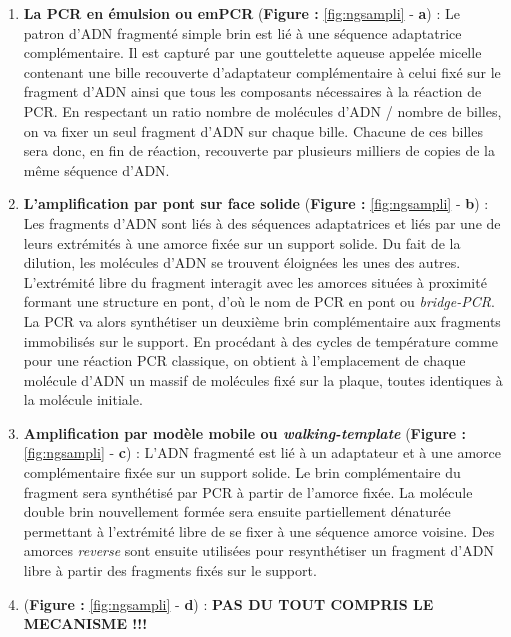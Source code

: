 \documentclass[12pt,twoside]{ugathesis}
\theoremstyle{definition}
\theoremstyle{definition}
\theoremstyle{remark}
\begin{document}
\begin{enumerate}
\def\labelenumi{\arabic{enumi}.}
\item
  \textbf{La PCR en émulsion ou emPCR} (\textbf{Figure :
  }\ref{fig:ngsampli} - \textbf{a}) : Le patron d'ADN fragmenté simple
  brin est lié à une séquence adaptatrice complémentaire. Il est capturé
  par une gouttelette aqueuse appelée micelle contenant une bille
  recouverte d'adaptateur complémentaire à celui fixé sur le fragment
  d'ADN ainsi que tous les composants nécessaires à la réaction de PCR.
  En respectant un ratio nombre de molécules d'ADN / nombre de billes,
  on va fixer un seul fragment d'ADN sur chaque bille. Chacune de ces
  billes sera donc, en fin de réaction, recouverte par plusieurs
  milliers de copies de la même séquence d'ADN.
\item
  \textbf{L'amplification par pont sur face solide} (\textbf{Figure :
  }\ref{fig:ngsampli} - \textbf{b}) : Les fragments d'ADN sont liés à
  des séquences adaptatrices et liés par une de leurs extrémités à une
  amorce fixée sur un support solide. Du fait de la dilution, les
  molécules d'ADN se trouvent éloignées les unes des autres. L'extrémité
  libre du fragment interagit avec les amorces situées à proximité
  formant une structure en pont, d'où le nom de PCR en pont ou
  \emph{bridge-PCR}. La PCR va alors synthétiser un deuxième brin
  complémentaire aux fragments immobilisés sur le support. En procédant
  à des cycles de température comme pour une réaction PCR classique, on
  obtient à l'emplacement de chaque molécule d'ADN un massif de
  molécules fixé sur la plaque, toutes identiques à la molécule
  initiale.
\item
  \textbf{Amplification par modèle mobile ou \emph{walking-template}
  }(\textbf{Figure : }\ref{fig:ngsampli} - \textbf{c}) : L'ADN fragmenté
  est lié à un adaptateur et à une amorce complémentaire fixée sur un
  support solide. Le brin complémentaire du fragment sera synthétisé par
  PCR à partir de l'amorce fixée. La molécule double brin nouvellement
  formée sera ensuite partiellement dénaturée permettant à l'extrémité
  libre de se fixer à une séquence amorce voisine. Des amorces
  \emph{reverse} sont ensuite utilisées pour resynthétiser un fragment
  d'ADN libre à partir des fragments fixés sur le support.
\item
  (\textbf{Figure : }\ref{fig:ngsampli} - \textbf{d}) : \textbf{PAS DU
  TOUT COMPRIS LE MECANISME !!! }
\end{enumerate}

\newpage 
\end{document}
